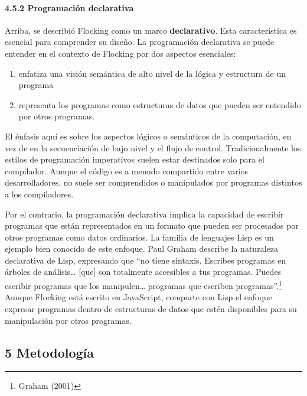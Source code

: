 \documentclass[]{article}
\let\oldparagraph\paragraph
\renewcommand{\paragraph}[1]{\oldparagraph{#1}\mbox{}}
\begin{document}
\hypertarget{programaciuxf3n-declarativa}{%
\paragraph{4.5.2 Programación
declarativa}\label{programaciuxf3n-declarativa}}

Arriba, se describió Flocking como un marco \textbf{declarativo}. Esta
característica es esencial para comprender su diseño. La programación
declarativa se puede entender en el contexto de Flocking por dos
aspectos esenciales:

\begin{enumerate}
\def\labelenumi{\arabic{enumi}.}
\item
  enfatiza una visión semántica de alto nivel de la lógica y estructura
  de un programa
\item
  representa los programas como estructuras de datos que pueden ser
  entendido por otros programas.
\end{enumerate}

El énfasis aquí es sobre los aspectos lógicos o semánticos de la
computación, en vez de en la secuenciación de bajo nivel y el flujo de
control. Tradicionalmente los estilos de programación imperativos suelen
estar destinados solo para el compilador. Aunque el código es a menudo
compartido entre varios desarrolladores, no suele ser comprendidos o
manipulados por programas distintos a los compiladores.

Por el contrario, la programación declarativa implica la capacidad de
escribir programas que están representados en un formato que pueden ser
procesados por otros programas como datos ordinarios. La familia de
lenguajes Lisp es un ejemplo bien conocido de este enfoque. Paul Graham
describe la naturaleza declarativa de Lisp, expresando que ``no tiene
sintaxis. Escribes programas en árboles de análisis\ldots{} {[}que{]}
son totalmente accesibles a tus programas. Puedes escribir programas que
los manipulen\ldots{} programas que escriben programas''.\footnote{Graham
  (2001)} Aunque Flocking está escrito en JavaScript, comparte con Lisp
el enfoque expresar programas dentro de estructuras de datos que estén
disponibles para su manipulación por otros programas.

\newpage

\hypertarget{metodologuxeda}{%
\subsection{5 Metodología}\label{metodologuxeda}}
\end{document}
